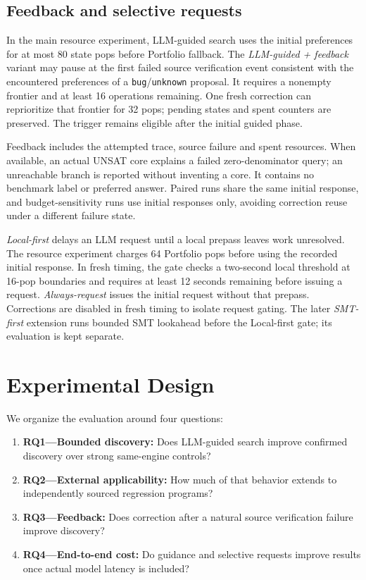 \documentclass[sigconf]{acmart}
\begin{document}
\subsection{Feedback and selective requests}
\label{sec:gates}
In the main resource experiment, LLM-guided search uses the initial
preferences for at most 80 state pops before Portfolio fallback. The
\emph{LLM-guided + feedback} variant may pause at the first failed source
verification event consistent with the encountered preferences of a
\texttt{bug}/\texttt{unknown} proposal. It requires a nonempty frontier and
at least 16 operations remaining. One fresh correction can reprioritize
that frontier for 32 pops; pending states and spent counters are preserved.
The trigger remains eligible after the initial guided phase.

Feedback includes the attempted trace, source failure and spent resources.
When available, an actual UNSAT core explains a failed zero-denominator
query; an unreachable branch is reported without inventing a core.
It contains no benchmark label or preferred answer. Paired runs share the
same initial response, and budget-sensitivity runs use initial responses
only, avoiding correction reuse under a different failure state.

\emph{Local-first} delays an LLM request until a local prepass leaves work
unresolved. The resource experiment charges 64 Portfolio pops before using
the recorded initial response. In fresh timing, the gate checks a two-second
local threshold at 16-pop boundaries and requires at least 12 seconds
remaining before issuing a request. \emph{Always-request} issues the initial
request without that prepass. Corrections are disabled in fresh timing to
isolate request gating. The later \emph{SMT-first} extension runs bounded SMT
lookahead before the Local-first gate; its evaluation is kept separate.

\section{Experimental Design}
\label{sec:experiment}
We organize the evaluation around four questions:
\begin{enumerate}
\item \textbf{RQ1---Bounded discovery:} Does LLM-guided search improve
confirmed discovery over strong same-engine controls?
\item \textbf{RQ2---External applicability:} How much of that behavior
extends to independently sourced regression programs?
\item \textbf{RQ3---Feedback:} Does correction after a natural source
verification failure improve discovery?
\item \textbf{RQ4---End-to-end cost:} Do guidance and selective requests
improve results once actual model latency is included?
\end{enumerate}
\end{document}
